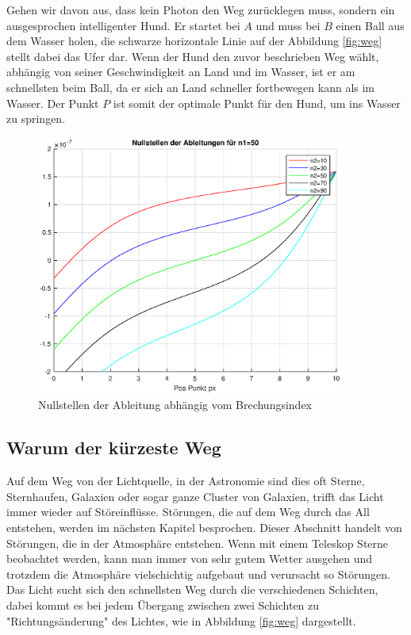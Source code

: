 \begin{refsection}
Gehen wir davon aus, dass kein Photon den Weg zurücklegen muss, sondern ein ausgesprochen intelligenter Hund. Er startet bei $A$ und muss bei $B$ einen Ball aus dem Wasser holen, die schwarze horizontale Linie auf der Abbildung \ref{fig:weg} stellt dabei das Ufer dar. Wenn der Hund den zuvor beschrieben Weg wählt, abhängig von seiner Geschwindigkeit an Land und im Wasser, ist er am schnellsten beim Ball, da er sich an Land schneller fortbewegen kann als im Wasser. Der Punkt $P$ ist somit der optimale Punkt für den Hund, um ins Wasser zu springen.

\begin{figure}
  \centering
  \includegraphics[width=0.9\textwidth]{adaptiv/images/Nullstellen}
  \caption{Nullstellen der Ableitung abhängig vom Brechungsindex}
  \label{fig:nullstelle}
\end{figure}

\subsection{Warum der kürzeste Weg}
Auf dem Weg von der Lichtquelle, in der Astronomie sind dies oft Sterne, Sternhaufen, Galaxien oder sogar ganze Cluster von Galaxien, trifft das Licht immer wieder auf Störeinflüsse. Störungen, die auf dem Weg durch das All entstehen, werden im nächsten Kapitel besprochen. Dieser Abschnitt handelt von Störungen, die in der Atmosphäre entstehen. Wenn mit einem Teleskop Sterne beobachtet werden, kann man immer von sehr gutem Wetter ausgehen und trotzdem die Atmosphäre vielschichtig aufgebaut und verursacht so Störungen. Das Licht sucht sich den schnellsten Weg durch die verschiedenen Schichten, dabei kommt es bei jedem Übergang zwischen zwei Schichten zu "Richtungsänderung" des Lichtes, wie in Abbildung \ref{fig:weg} dargestellt.


\end{refsection}
